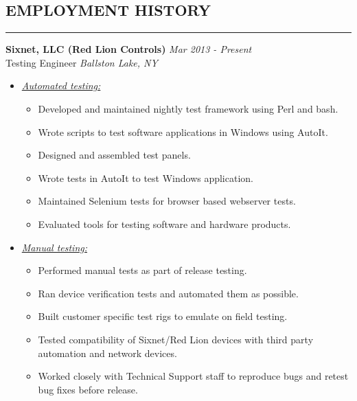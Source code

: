 \documentclass{article}
\begin{document}
\subsection*{\MakeUppercase{\bf Employment History}}
    \hrule
    \bigskip
    {\bf Sixnet, LLC (Red Lion Controls)} \hfill {\em Mar 2013 - Present} \\
    Testing Engineer \hfill {\em Ballston Lake, NY} \\
    \begin{itemize}
    \item \underline{\it Automated testing:}
          \begin{itemize}
          \item Developed and maintained nightly test framework using Perl
                and bash.
          \item Wrote scripts to test software applications in Windows using
                AutoIt.
          \item Designed and assembled test panels.
          \item Wrote tests in AutoIt to test Windows application.
          \item Maintained Selenium tests for browser based webserver tests.
          \item Evaluated tools for testing software and hardware products.
          \end{itemize}
    \item \underline{\it Manual testing:}
          \begin{itemize}
          \item Performed manual tests as part of release testing.
          \item Ran device verification tests and automated them as possible.
          \item Built customer specific test rigs to emulate on field testing.
          \item Tested compatibility of Sixnet/Red Lion devices with third
                party automation and network devices.
          \item Worked closely with Technical Support staff to reproduce bugs
                and retest bug fixes before release.
          \end{itemize}
    \end{itemize}
    \bigskip
\end{document}
